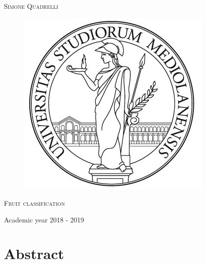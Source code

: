 \documentclass{article}
\begin{document}
\begin{titlepage}
	
	
	\begin{center}
		\vspace{2 cm}
		{\Large \textsc{Simone Quadrelli} }
	\end{center}
	
	
	\begin{figure}[H]
		\vspace{2 cm}
		\centering
		\includegraphics[width=0.30\linewidth]{tesiSCIENZE_TECNOLOGIE.jpg}
		
	\end{figure}
	
	\begin{center}
		\vspace{2 cm}
		{\Large \textsc{Fruit classification} }
	\end{center}

	\par
	\vspace{3 cm}
	
	\begin{center}
		{\large Academic year 2018 - 2019}
	\end{center}
\end{titlepage}

\newpage 
{}
\tableofcontents
\listoftables
\listoffigures
\newpage


\section*{Abstract}
\end{document}

